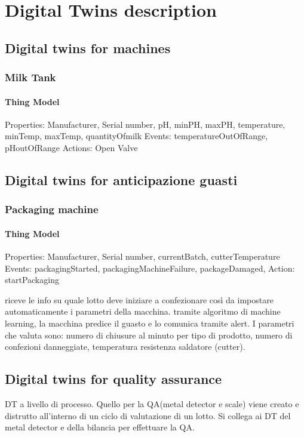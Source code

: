 \chapter{Digital Twins description}

\section{Digital twins for machines}
\subsection{Milk Tank}
\subsubsection{Thing Model}
Properties: Manufacturer, Serial number, pH, minPH, maxPH, temperature, minTemp, maxTemp, quantityOfmilk
Events: temperatureOutOfRange, pHoutOfRange
Actions: Open Valve

\section{Digital twins for anticipazione guasti}
\subsection{Packaging machine}
\subsubsection{Thing Model}
Properties: Manufacturer, Serial number, currentBatch, cutterTemperature
Events: packagingStarted, packagingMachineFailure, packageDamaged,
Action: startPackaging


riceve le info su quale lotto deve iniziare a confezionare così da impostare automaticamente i parametri della macchina.
tramite algoritmo di machine learning, la macchina predice il guasto e lo comunica tramite alert.
I parametri che valuta sono: numero di chiusure al minuto per tipo di prodotto, numero di confezioni danneggiate, temperatura resistenza saldatore (cutter).

\section{Digital twins for quality assurance}
DT a livello di processo. Quello per la QA(metal detector e scale) viene creato e distrutto all'interno di un ciclo di valutazione di un lotto.
Si collega ai DT del metal detector e della bilancia per effettuare la QA.
